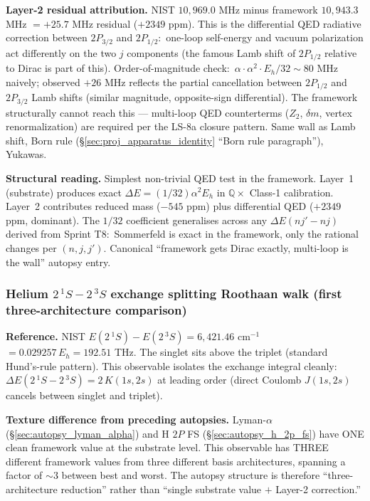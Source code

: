 \documentclass[11pt]{article}
\begin{document}
\textbf{Layer-2 residual attribution.}  NIST $10{,}969.0$ MHz minus
framework $10{,}943.3$ MHz $= +25.7$ MHz residual ($+2349$ ppm).
This is the differential QED radiative correction between
$2P_{3/2}$ and $2P_{1/2}$:\ one-loop self-energy and vacuum
polarization act differently on the two $j$ components (the famous
Lamb shift of $2P_{1/2}$ relative to Dirac is part of this).
Order-of-magnitude check:\ $\alpha \cdot \alpha^2 \cdot E_h / 32
\sim 80$ MHz naively; observed $+26$ MHz reflects the partial
cancellation between $2P_{1/2}$ and $2P_{3/2}$ Lamb shifts (similar
magnitude, opposite-sign differential).  The framework structurally
cannot reach this --- multi-loop QED counterterms ($Z_2$, $\delta m$,
vertex renormalization) are required per the LS-8a closure pattern.
Same wall as Lamb shift, Born rule (\S\ref{sec:proj_apparatus_identity}
``Born rule paragraph''), Yukawas.

\textbf{Structural reading.}  Simplest non-trivial QED test in the
framework.  Layer~1 (substrate) produces exact
$\Delta E = (1/32) \alpha^2 E_h$ in $\mathbb{Q} \times$ Class-1
calibration.  Layer~2 contributes reduced mass ($-545$ ppm) plus
differential QED ($+2349$ ppm, dominant).  The $1/32$ coefficient
generalises across any $\Delta E(nj' - nj)$ derived from Sprint T8:\
Sommerfeld is exact in the framework, only the rational changes
per $(n, j, j')$.  Canonical ``framework gets Dirac exactly,
multi-loop is the wall'' autopsy entry.

\subsubsection{Helium $2\,^{1}S - 2\,^{3}S$ exchange splitting Roothaan walk
(first three-architecture comparison)}
\label{sec:autopsy_he_singlet_triplet}

\textbf{Reference.} NIST $E(2\,^{1}S) - E(2\,^{3}S) = 6{,}421.46$
cm$^{-1}$ $= 0.029257\,E_h = 192.51$ THz.  The singlet sits above
the triplet (standard Hund's-rule pattern).  This observable
isolates the exchange integral cleanly:
$\Delta E(2\,^{1}S - 2\,^{3}S) = 2\,K(1s, 2s)$ at leading order
(direct Coulomb $J(1s, 2s)$ cancels between singlet and triplet).

\textbf{Texture difference from preceding autopsies.}  Lyman-$\alpha$
(\S\ref{sec:autopsy_lyman_alpha}) and H $2P$ FS
(\S\ref{sec:autopsy_h_2p_fs}) have ONE clean framework value at
the substrate level.  This observable has THREE different framework
values from three different basis architectures, spanning a factor
of $\sim 3$ between best and worst.  The autopsy structure is
therefore ``three-architecture reduction'' rather than ``single
substrate value $+$ Layer-2 correction.''
\end{document}
